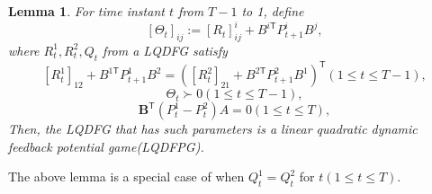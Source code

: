 \documentclass[letterpaper, 10 pt, conference]{ieeeconf}  %
\newcommand{\transpose}{\mathsf{T}}
\newtheorem{lemma}{Lemma}
\begin{document}
\begin{lemma}
    For time instant $t$ from $T-1$ to 1, define
        \begin{equation}\label{eq:Theta}
        [\Theta_{t}]_{ij} := [R_{t}]^{i}_{ij} + B^{i\transpose}P_{t+1}^{i}B^{j},
        \end{equation}
    where $R_{t}^{1},R_{t}^{2},Q_{t}$ from a LQDFG satisfy
        \begin{equation}\label{eq:costFPDG1}
            [R_{t}^{1}]_{12} + B^{1\transpose}P_{t+1}^{1}B^{2} = ([R_{t}^{2}]_{21} + B^{2\transpose}P_{t+1}^{2}B^{1})^{\transpose}(1\leq t\leq T-1),
        \end{equation}
        \begin{equation}\label{eq:costFPDG2}
            \Theta_{t} \succ 0(1\leq t \leq T-1),
        \end{equation}
        \begin{equation}\label{eq:costFPDG3}
            \mathbf{B}^{\transpose}(P_{t}^{1}-P_{t}^{2})A=0(1\leq t \leq T),
        \end{equation}
    Then, the LQDFG that has such parameters is a linear quadratic dynamic feedback potential game(LQDFPG).
\end{lemma}
The above lemma is a special case of \cite[Theorem 6]{prasad_structure_2023} when $Q_{t}^{1}=Q_{t}^{2}$ for $t(1\leq t \leq T)$.
\end{document}

